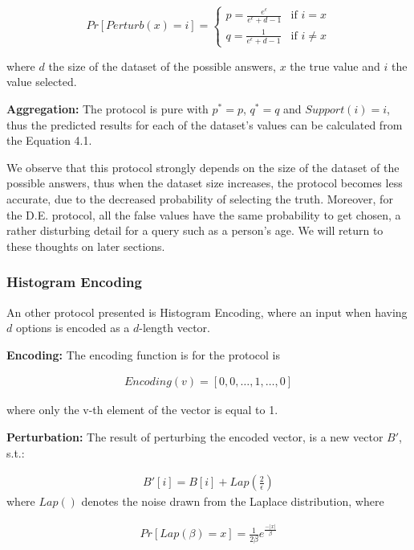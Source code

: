 \begin{equation*}
    Pr[Perturb(x) = i] =
	\begin{cases}
    	p = \frac{e^\epsilon}{e^\epsilon + d - 1} & \mbox{if } i = x \\
    	q = \frac{1}{e^\epsilon + d - 1} & \mbox{if } i \neq x 
	\end{cases}
\end{equation*}

where $d$ the size of the dataset of the possible answers, $x$ the true value and $i$ the value selected.

\textbf{Aggregation:} The protocol is pure with $p^* = p$, $q^* = q$ and $Support(i) = i$, thus the predicted results for each of the dataset's values can be calculated from the Equation 4.1.

We observe that this protocol strongly depends on the size of the dataset of the possible answers, thus when the dataset size increases, the protocol becomes less accurate, due to the decreased probability of selecting the truth. Moreover, for the D.E. protocol, all the false values have the same probability to get chosen, a rather disturbing detail for a query such as a person's age. We will return to these thoughts on later sections.

\subsubsection{Histogram Encoding}

An other protocol presented is Histogram Encoding, where an input when having $d$ options is encoded as a $d$-length vector.

\textbf{Encoding:} The encoding function is for the protocol is

\begin{align*}
    Encoding(v) = [0, 0, \dots, 1, \dots, 0]
\end{align*}

where only the v-th element of the vector is equal to 1.

\textbf{Perturbation:} The result of perturbing the encoded vector, is a new vector $B'$, s.t.: 

\begin{align*}
    B'[i] = B[i] + Lap(\frac{2}{\epsilon})
\end{align*}
where $Lap()$ denotes the noise drawn from the Laplace distribution, where


\begin{align*}
    Pr[Lap(\beta) = x] = \frac{1}{2\beta}e^{\frac{-|x|}{\beta}}
\end{align*}

